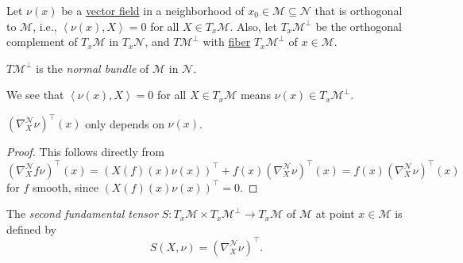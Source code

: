 Let \(\nu (x)\) be a \hyperref[def:vector-field]{vector field} in a neighborhood of \(x_0\in \mathcal{M} \subseteq \mathcal{N} \) that is orthogonal to \(\mathcal{M} \), i.e., \(\left\langle \nu (x), X \right\rangle = 0\) for all \(X\in T_x \mathcal{M} \). Also, let \(T_x \mathcal{M} ^{\perp} \) be the orthogonal complement of \(T_x \mathcal{M} \) in \(T_x \mathcal{N} \), and \(T \mathcal{M} ^{\perp} \) with \hyperref[def:fiber]{fiber} \(T_x \mathcal{M} ^{\perp} \) of \(x\in \mathcal{M} \).

\begin{center}
\end{center}

\begin{notation}\label{not:normal-bundle}
	\(T \mathcal{M} ^{\perp} \) is the \emph{normal bundle} of \(\mathcal{M} \) in \(\mathcal{N} \).
\end{notation}

We see that \(\left\langle \nu (x), X \right\rangle = 0\) for all \(X\in T_x \mathcal{M} \) means \(\nu (x)\in T_x \mathcal{M} ^{\perp} \).

\begin{lemma}
	\((\nabla _X ^\mathcal{N} \nu )^{\top}(x)\) only depends on \(\nu (x)\).
\end{lemma}
\begin{proof}
	This follows directly from
	\[
		(\nabla _X ^\mathcal{N} f \nu )^{\top}(x)
		= \left( X(f)(x) \nu (x) \right) ^{\top} + f(x) (\nabla _X ^\mathcal{N} \nu )^{\top} (x)
		= f(x) (\nabla _X ^\mathcal{N} \nu )^{\top} (x)
	\]
	for \(f\) smooth, since \(\left( X(f)(x) \nu (x) \right) ^{\top} = 0\).
\end{proof}

\begin{definition}\label{def:2nd-fundamental-tensor}
	The \emph{second fundamental tensor} \(S\colon T_x \mathcal{M} \times T_x \mathcal{M} ^{\perp} \to T_x \mathcal{M} \) of \(\mathcal{M} \) at point \(x\in \mathcal{M} \) is defined by
	\[
		S(X, \nu ) = (\nabla ^\mathcal{N} _X \nu )^{\top}.
	\]
\end{definition}

